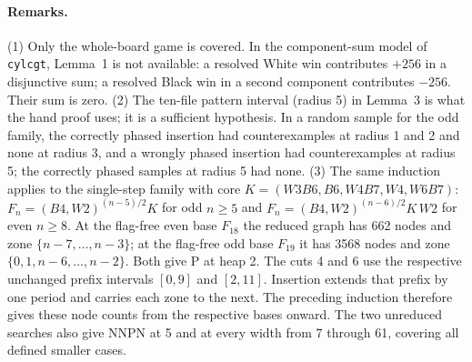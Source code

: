 \paragraph{Remarks.}
(1) Only the whole-board game is covered. In the component-sum model of \texttt{cylcgt}, Lemma~1 is not available: a resolved White win contributes $+256$ in a disjunctive sum; a resolved Black win in a second component contributes $-256$. Their sum is zero.
(2) The ten-file pattern interval (radius 5) in Lemma~3 is what the hand proof uses; it is a sufficient hypothesis. In a random sample
for the odd family, the correctly phased insertion had counterexamples at radius 1 and 2 and none at radius 3, and a wrongly phased
insertion had counterexamples at radius 5; the correctly phased samples at radius 5 had none.
(3) The same induction applies to the single-step family with core $K=(W3B6,B6,W4B7,W4,W6B7)$: $F_n=(B4,W2)^{(n-5)/2}K$ for odd
$n\ge5$ and $F_n=(B4,W2)^{(n-6)/2}K\,W2$ for even $n\ge8$. At the flag-free even base $F_{18}$ the reduced graph has 662 nodes and zone $\{n-7,\dots,n-3\}$; at the flag-free odd base $F_{19}$ it has 3568 nodes and zone $\{0,1,n-6,\dots,n-2\}$. Both give P at heap 2. The cuts 4 and 6 use the respective unchanged prefix intervals $[0,9]$ and $[2,11]$. Insertion extends that prefix by one period and carries each zone to the next. The preceding induction therefore gives these node counts from the respective bases onward. The two unreduced searches also give NNPN at 5 and at every width from 7 through 61, covering all defined smaller cases.

